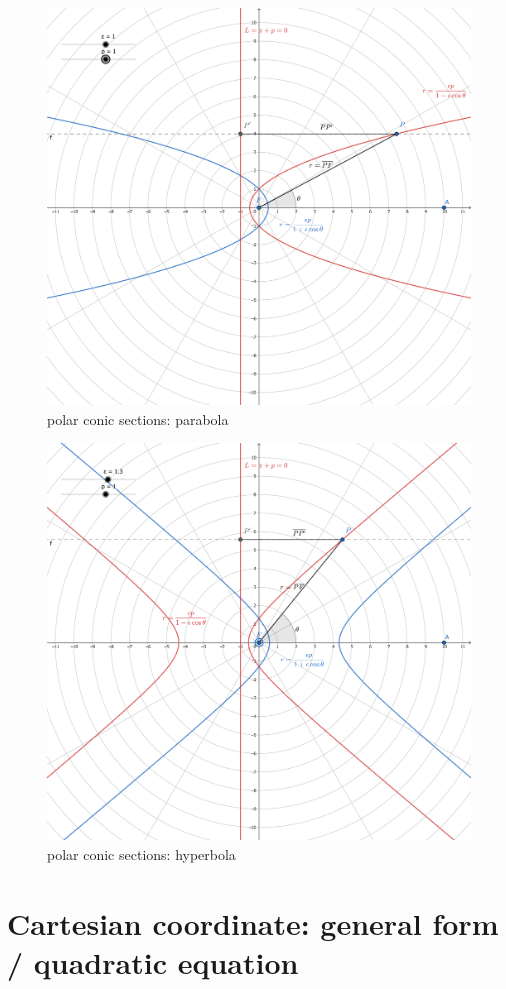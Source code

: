 \documentclass[
]{book}
\theoremstyle{definition}
\theoremstyle{definition}
\theoremstyle{definition}
\theoremstyle{definition}
\theoremstyle{remark}
\begin{document}
\begin{figure}
\includegraphics[width=0.75\linewidth]{img/conic-sections-polar-parabola} \caption{polar conic sections: parabola}\label{fig:unnamed-chunk-8}
\end{figure}

\begin{figure}
\includegraphics[width=0.75\linewidth]{img/conic-sections-polar-hyperbola} \caption{polar conic sections: hyperbola}\label{fig:unnamed-chunk-9}
\end{figure}

\hypertarget{cartesian-coordinate-general-form-quadratic-equation}{%
\section{Cartesian coordinate: general form / quadratic equation}\label{cartesian-coordinate-general-form-quadratic-equation}}
\end{document}
